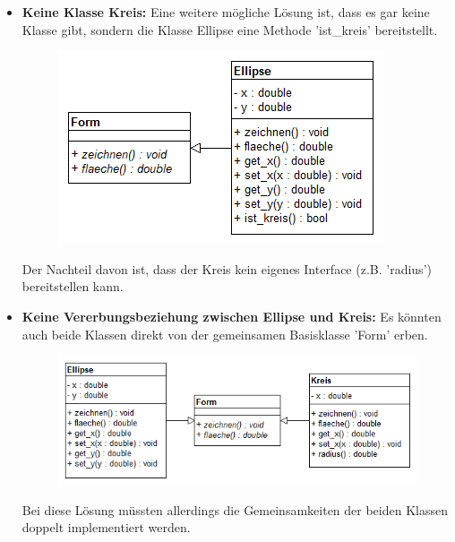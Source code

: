 \begin{itemize}
						\item {\bfseries Keine Klasse Kreis:}
							Eine weitere mögliche Lösung ist, dass es gar keine Klasse gibt, sondern die Klasse Ellipse
							eine Methode 'ist\_kreis' bereitstellt.
							\begin{figure}[H]
								\includegraphics[scale=0.6]{polymorphie/universell/vererbung/ellipse-kreis-problem/loesungen/keine_klasse_kreis.png}
							\end{figure}
							Der Nachteil davon ist, dass der Kreis kein eigenes Interface (z.B. 'radius') bereitstellen kann.
						
						\item {\bfseries Keine Vererbungsbeziehung zwischen Ellipse und Kreis:}
							Es könnten auch beide Klassen direkt von der gemeinsamen Basisklasse 'Form' erben.
							\begin{figure}[H]
								\includegraphics[scale=0.6]{polymorphie/universell/vererbung/ellipse-kreis-problem/loesungen/keine_vererbungsbeziehung_zwischen_ellipse_und_kreis.png}
							\end{figure}
							Bei diese Lösung müssten allerdings die Gemeinsamkeiten der beiden Klassen doppelt implementiert
							werden.
							

\end{itemize}
